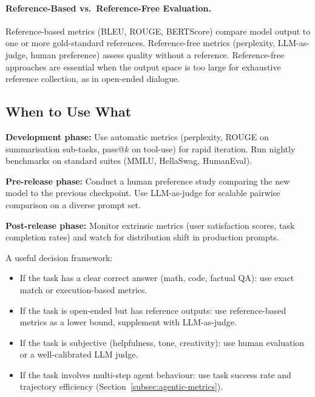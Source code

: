 \paragraph{Reference-Based vs.~Reference-Free Evaluation.}
\label{reference-based-vs.-reference-free-evaluation.}

Reference-based metrics (BLEU, ROUGE, BERTScore) compare model output to one or more gold-standard references. Reference-free metrics (perplexity, LLM-as-judge, human preference) assess quality without a reference. Reference-free approaches are essential when the output space is too large for exhaustive reference collection, as in open-ended dialogue.

\subsection{When to Use What}
\label{when-to-use-what}

\begin{examplebox}
\textbf{Development phase:} Use automatic metrics (perplexity, ROUGE on summarisation sub-tasks, pass@$k$ on tool-use) for rapid iteration. Run nightly benchmarks on standard suites (MMLU, HellaSwag, HumanEval).

\textbf{Pre-release phase:} Conduct a human preference study comparing the new model to the previous checkpoint. Use LLM-as-judge for scalable pairwise comparison on a diverse prompt set.

\textbf{Post-release phase:} Monitor extrinsic metrics (user satisfaction scores, task completion rates) and watch for distribution shift in production prompts.
\end{examplebox}

A useful decision framework:

\begin{itemize}
  \item If the task has a clear correct answer (math, code, factual QA): use exact match or execution-based metrics.
  \item If the task is open-ended but has reference outputs: use reference-based metrics as a lower bound, supplement with LLM-as-judge.
  \item If the task is subjective (helpfulness, tone, creativity): use human evaluation or a well-calibrated LLM judge.
  \item If the task involves multi-step agent behaviour: use task success rate and trajectory efficiency (Section~\ref{subsec:agentic-metrics}).
\end{itemize}

